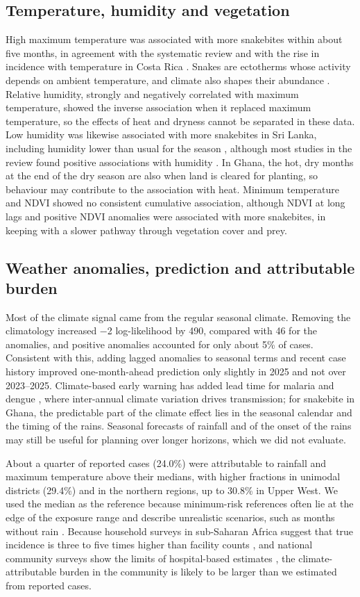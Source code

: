 \documentclass[11pt,a4paper]{article}
\begin{document}
\subsection{Temperature, humidity and vegetation}

High maximum temperature was associated with more snakebites within about five months, in agreement with the systematic review \cite{ref8} and with the rise in incidence with temperature in Costa Rica \cite{ref9}. Snakes are ectotherms whose activity depends on ambient temperature, and climate also shapes their abundance \cite{ref61}. Relative humidity, strongly and negatively correlated with maximum temperature, showed the inverse association when it replaced maximum temperature, so the effects of heat and dryness cannot be separated in these data. Low humidity was likewise associated with more snakebites in Sri Lanka, including humidity lower than usual for the season \cite{ref65}, although most studies in the review found positive associations with humidity \cite{ref8}. In Ghana, the hot, dry months at the end of the dry season are also when land is cleared for planting, so behaviour may contribute to the association with heat. Minimum temperature and NDVI showed no consistent cumulative association, although NDVI at long lags and positive NDVI anomalies were associated with more snakebites, in keeping with a slower pathway through vegetation cover and prey.

\subsection{Weather anomalies, prediction and attributable burden}

Most of the climate signal came from the regular seasonal climate. Removing the climatology increased −2 log-likelihood by 490, compared with 46 for the anomalies, and positive anomalies accounted for only about 5\% of cases. Consistent with this, adding lagged anomalies to seasonal terms and recent case history improved one-month-ahead prediction only slightly in 2025 and not over 2023--2025. Climate-based early warning has added lead time for malaria and dengue \cite{ref66,ref67}, where inter-annual climate variation drives transmission; for snakebite in Ghana, the predictable part of the climate effect lies in the seasonal calendar and the timing of the rains. Seasonal forecasts of rainfall and of the onset of the rains may still be useful for planning over longer horizons, which we did not evaluate.

About a quarter of reported cases (24.0\%) were attributable to rainfall and maximum temperature above their medians, with higher fractions in unimodal districts (29.4\%) and in the northern regions, up to 30.8\% in Upper West. We used the median as the reference because minimum-risk references often lie at the edge of the exposure range and describe unrealistic scenarios, such as months without rain \cite{ref46}. Because household surveys in sub-Saharan Africa suggest that true incidence is three to five times higher than facility counts \cite{ref55}, and national community surveys show the limits of hospital-based estimates \cite{ref68}, the climate-attributable burden in the community is likely to be larger than we estimated from reported cases.
\end{document}
